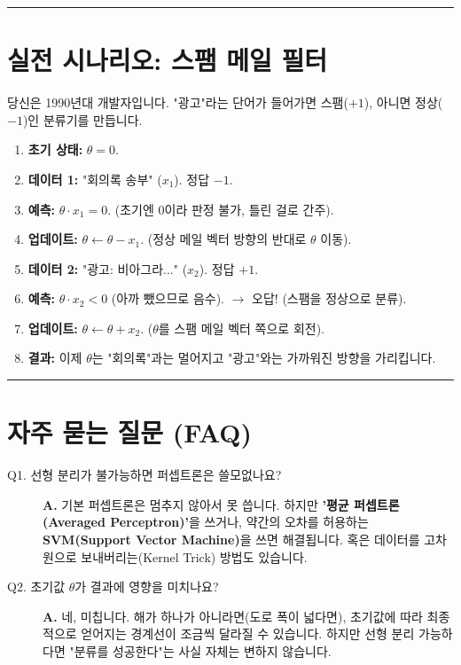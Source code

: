 \documentclass[11pt,a4paper]{book}
\theoremstyle{definition}
\begin{document}
\vspace{0.5cm}\hrule\vspace{0.5cm}

\section{실전 시나리오: 스팸 메일 필터}

\begin{storybox}[title={Scenario: 초기 스팸 필터}]
당신은 1990년대 개발자입니다. "광고"라는 단어가 들어가면 스팸($+1$), 아니면 정상($-1$)인 분류기를 만듭니다.
\end{storybox}

\begin{enumerate}
    \item \textbf{초기 상태:} $\theta = 0$.
    \item \textbf{데이터 1:} "회의록 송부" ($x_1$). 정답 $-1$.
    \item \textbf{예측:} $\theta \cdot x_1 = 0$. (초기엔 0이라 판정 불가, 틀린 걸로 간주).
    \item \textbf{업데이트:} $\theta \leftarrow \theta - x_1$. (정상 메일 벡터 방향의 반대로 $\theta$ 이동).
    \item \textbf{데이터 2:} "광고: 비아그라..." ($x_2$). 정답 $+1$.
    \item \textbf{예측:} $\theta \cdot x_2 < 0$ (아까 뺐으므로 음수). $\rightarrow$ 오답! (스팸을 정상으로 분류).
    \item \textbf{업데이트:} $\theta \leftarrow \theta + x_2$. ($\theta$를 스팸 메일 벡터 쪽으로 회전).
    \item \textbf{결과:} 이제 $\theta$는 "회의록"과는 멀어지고 "광고"와는 가까워진 방향을 가리킵니다.
\end{enumerate}

\vspace{0.5cm}\hrule\vspace{0.5cm}

\section{자주 묻는 질문 (FAQ)}

\begin{description}
    \item[Q1. 선형 분리가 불가능하면 퍼셉트론은 쓸모없나요?]
    \textbf{A.} 기본 퍼셉트론은 멈추지 않아서 못 씁니다. 하지만 \textbf{'평균 퍼셉트론(Averaged Perceptron)'}을 쓰거나, 약간의 오차를 허용하는 \textbf{SVM(Support Vector Machine)}을 쓰면 해결됩니다. 혹은 데이터를 고차원으로 보내버리는(Kernel Trick) 방법도 있습니다.
    
    \item[Q2. 초기값 $\theta$가 결과에 영향을 미치나요?]
    \textbf{A.} 네, 미칩니다. 해가 하나가 아니라면(도로 폭이 넓다면), 초기값에 따라 최종적으로 얻어지는 경계선이 조금씩 달라질 수 있습니다. 하지만 선형 분리 가능하다면 "분류를 성공한다"는 사실 자체는 변하지 않습니다.
\end{description}
\end{document}
